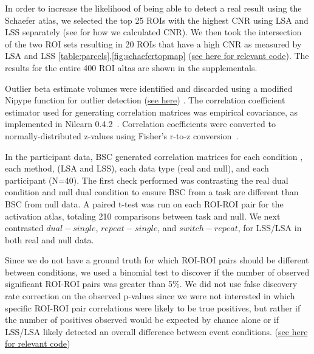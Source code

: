 \documentclass[10pt,letterpaper]{article}
\begin{document}
In order to increase the likelihood of being able to detect a real result using the Schaefer atlas,
we selected the top 25 ROIs with the highest CNR using LSA and LSS separately
(see  for how we calculated CNR).
We then took the intersection of the two ROI sets resulting in 20 ROIs that have a high CNR
as measured by LSA and LSS \ref{table:parcels},\ref{fig:schaefertopmap}
(\href{https://github.com/jdkent/BetaSeriesRealDataAnalysis/blob/master/nibsAnalysis/cnr_trial_variability.ipynb}{see here for relevant code}).
The results for the entire 400 ROI altas are shown in the supplementals.

Outlier beta estimate volumes were identified and discarded using a
modified Nipype function for outlier detection
(\href{https://github.com/HBClab/NiBetaSeries/blob/a45c0a1f/src/nibetaseries/interfaces/nilearn.py#L153}{see here}) \cite{Crosby1994}.
The correlation coefficient estimator used for generating correlation matrices
was empirical covariance, as implemented in Nilearn 0.4.2~\cite{Abraham2014}.
Correlation coefficients were converted to normally-distributed z-values using
Fisher's r-to-z conversion~\cite{Fisher1915}.

In the participant data, BSC generated correlation matrices for each condition ,
each method, (LSA and LSS), each data type (real and null), and each participant (N=40).
The first check performed was contrasting the real dual condition and null dual condition
to ensure BSC from a task are different than BSC from null data.
A paired t-test was run on each ROI-ROI pair for the activation atlas, totaling 210 comparisons
between task and null.
We next contrasted $dual - single$, $repeat - single$, and $switch - repeat$, for LSS/LSA in both
real and null data.

Since we do not have a ground truth for which ROI-ROI pairs should be different between conditions,
we used a binomial test to discover if the number of observed significant ROI-ROI pairs was greater
than 5\%.
We did not use false discovery rate correction on the observed p-values since we were not interested in
which specific ROI-ROI pair correlations were likely to be true positives, but rather if the number of positives
observed would be expected by chance alone or if LSS/LSA likely detected an overall difference between event conditions.
(\href{https://github.com/jdkent/BetaSeriesRealDataAnalysis/blob/90fafb5b83b2e1bfade61a9fb1a87f225efaa95f/nibsAnalysis/BetaSeriesAnalysis.ipynb}{see here for relevant code})
\end{document}
